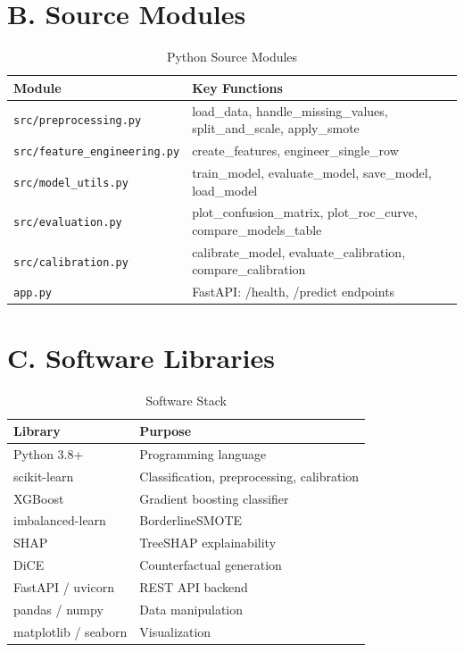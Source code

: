 \documentclass[12pt]{report}
\begin{document}
\section*{B. Source Modules}

\begin{table}[H]
\centering
\caption{Python Source Modules}
\label{tab:source_modules}
\begin{tabular}{lp{7.5cm}}
\toprule
\textbf{Module} & \textbf{Key Functions} \\
\midrule
\texttt{src/preprocessing.py} & load\_data, handle\_missing\_values, split\_and\_scale, apply\_smote \\
\texttt{src/feature\_engineering.py} & create\_features, engineer\_single\_row \\
\texttt{src/model\_utils.py} & train\_model, evaluate\_model, save\_model, load\_model \\
\texttt{src/evaluation.py} & plot\_confusion\_matrix, plot\_roc\_curve, compare\_models\_table \\
\texttt{src/calibration.py} & calibrate\_model, evaluate\_calibration, compare\_calibration \\
\texttt{app.py} & FastAPI: /health, /predict endpoints \\
\bottomrule
\end{tabular}
\end{table}

\section*{C. Software Libraries}

\begin{table}[H]
\centering
\caption{Software Stack}
\label{tab:software}
\begin{tabular}{ll}
\toprule
\textbf{Library} & \textbf{Purpose} \\
\midrule
Python 3.8+ & Programming language \\
scikit-learn & Classification, preprocessing, calibration \\
XGBoost & Gradient boosting classifier \\
imbalanced-learn & BorderlineSMOTE \\
SHAP & TreeSHAP explainability \\
DiCE & Counterfactual generation \\
FastAPI / uvicorn & REST API backend \\
pandas / numpy & Data manipulation \\
matplotlib / seaborn & Visualization \\
\bottomrule
\end{tabular}
\end{table}
\end{document}
